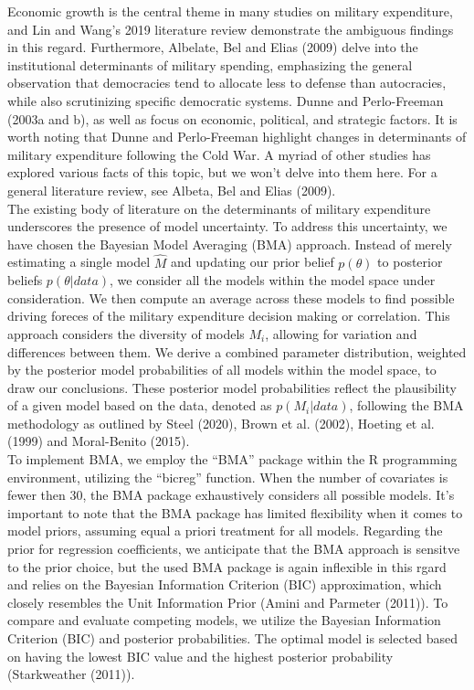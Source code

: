 \documentclass[12pt,a4paper]{article}
\begin{document}
Economic growth is the central theme in many studies on military expenditure, and Lin and Wang’s 2019 literature review demonstrate the ambiguous findings in this regard. Furthermore, Albelate, Bel and Elias (2009) delve into the institutional determinants of military spending, emphasizing the general observation that democracies tend to allocate less to defense than autocracies, while also scrutinizing specific democratic systems. Dunne and Perlo-Freeman (2003a and b), as well as \citet{nikolaidou2008} focus on economic, political, and strategic factors. It is worth noting that Dunne and Perlo-Freeman highlight changes in determinants of military expenditure following the Cold War. A myriad of other studies has explored various facts of this topic, but we won’t delve into them here. For a general literature review, see Albeta, Bel and Elias (2009). \\

The existing body of literature on the determinants of military expenditure underscores the presence of model uncertainty. To address this uncertainty, we have chosen the Bayesian Model Averaging (BMA) approach. Instead of merely estimating a single model $\hat{M}$ and updating our prior belief $p(\theta)$ to posterior beliefs $p(\theta \vert data)$, we consider all the models within the model space under consideration. We then compute an average across these models to find possible driving foreces of the military expenditure decision making or correlation. This approach considers the diversity of models $M_{i}$, allowing for variation and differences between them. We derive a combined parameter distribution, weighted by the posterior model probabilities of all models within the model space, to draw our conclusions. These posterior model probabilities reflect the plausibility of a given model based on the data, denoted as $p(M_{i}\vert data)$, following the BMA methodology as outlined by Steel (2020), Brown et al. (2002),  Hoeting et al. (1999) and Moral-Benito (2015).\\

To implement BMA, we employ the “BMA” package within the R programming environment, utilizing the “bicreg” function. When the number of covariates is fewer then 30, the BMA package exhaustively considers all possible models. It’s important to note that the BMA package has limited flexibility when it comes to model priors, assuming equal a priori treatment for all models. Regarding the prior for regression coefficients, we anticipate that the BMA approach is sensitve to the prior choice, but the used BMA package is again inflexible in this rgard and relies on the Bayesian Information Criterion (BIC) approximation, which closely resembles the Unit Information Prior (Amini and Parmeter (2011)). To compare and evaluate competing models, we utilize the Bayesian Information Criterion (BIC) and posterior probabilities. The optimal model is selected based on having the lowest BIC value and the highest posterior probability (Starkweather (2011)).
\end{document}
